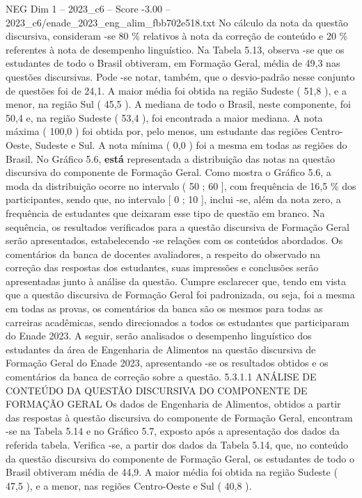 \begin{textsample}{NEG Dim 1 – 2023\_c6 – Score -3.00 – 2023\_c6/enade\_2023\_eng\_alim\_fbb702e518.txt}
No cálculo da nota da questão discursiva, consideram -se 80 \% relativos à nota da correção de conteúdo e 20 \% referentes à nota de desempenho linguístico.
Na Tabela 5.13, observa -se que os estudantes de todo o Brasil obtiveram, em Formação Geral, média de 49,3 nas questões discursivas.
Pode -se notar, também, que o desvio-padrão nesse conjunto de questões foi de 24,1.
A maior média foi obtida na região Sudeste ( 51,8 ), e a menor, na região Sul ( 45,5 ).
A mediana de todo o Brasil, neste componente, foi 50,4 e, na região Sudeste ( 53,4 ), foi encontrada a maior mediana.
A nota máxima ( 100,0 ) foi obtida por, pelo menos, um estudante das regiões Centro-Oeste, Sudeste e Sul.
A nota mínima ( 0,0 ) foi a mesma em todas as regiões do Brasil.
No Gráfico 5.6, \textbf{está} representada a distribuição das notas na questão discursiva do componente de Formação Geral.
Como mostra o Gráfico 5.6, a moda da distribuição ocorre no intervalo ( 50 ; 60 ], com frequência de 16,5 \% dos participantes, sendo que, no intervalo [ 0 ; 10 ], inclui -se, além da nota zero, a frequência de estudantes que deixaram esse tipo de questão em branco.
Na sequência, os resultados verificados para a questão discursiva de Formação Geral serão apresentados, estabelecendo -se relações com os conteúdos abordados.
Os comentários da banca de docentes avaliadores, a respeito do observado na correção das respostas dos estudantes, suas impressões e conclusões serão apresentadas junto à análise da questão.
Cumpre esclarecer que, tendo em vista que a questão discursiva de Formação Geral foi padronizada, ou seja, foi a mesma em todas as provas, os comentários da banca são os mesmos para todas as carreiras acadêmicas, sendo direcionados a todos os estudantes que participaram do Enade 2023.
A seguir, serão analisados o desempenho linguístico dos estudantes da área de Engenharia de Alimentos na questão discursiva de Formação Geral do Enade 2023, apresentando -se os resultados obtidos e os comentários da banca de correção sobre a questão. 5.3.1.1 ANÁLISE DE CONTEÚDO DA QUESTÃO DISCURSIVA DO COMPONENTE DE FORMAÇÃO GERAL Os dados de Engenharia de Alimentos, obtidos a partir das respostas à questão discursiva do componente de Formação Geral, encontram -se na Tabela 5.14 e no Gráfico 5.7, exposto após a apresentação dos dados da referida tabela.
Verifica -se, a partir dos dados da Tabela 5.14, que, no conteúdo da questão discursiva do componente de Formação Geral, os estudantes de todo o Brasil obtiveram média de 44,9.
A maior média foi obtida na região Sudeste ( 47,5 ), e a menor, nas regiões Centro-Oeste e Sul ( 40,8 ).

\end{textsample}
